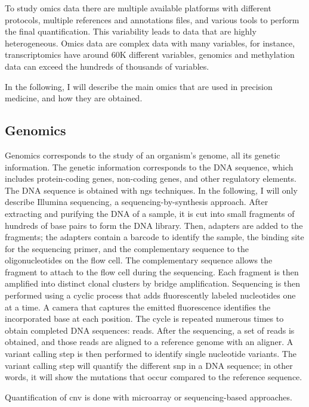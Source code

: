 \documentclass[../main.tex]{subfiles}
\begin{document}
 To study omics data there are multiple available platforms with different protocols, multiple references and annotations files, and various tools to perform the final quantification.
 This variability leads to data that are highly heterogeneous.
 Omics data are complex data with many variables, for instance, transcriptomics have around 60K different variables, genomics and methylation data can exceed the hundreds of thousands of variables.

 In the following, I will describe the main omics that are used in precision medicine, and how they are obtained.

 \subsection{Genomics}\label{subsec:genomics}
	 Genomics corresponds to the study of an organism's genome, \ie{}all its genetic information.
	 The genetic information corresponds to the DNA sequence, which includes protein-coding genes, non-coding genes, and other regulatory elements.
	 The DNA sequence is obtained with \gls{ngs} techniques.
	 In the following, I will only describe Illumina sequencing, a sequencing-by-synthesis approach.
	 After extracting and purifying the DNA of a sample, it is cut into small fragments of hundreds of base pairs to form the DNA library.
	 Then, adapters are added to the fragments; the adapters contain a barcode to identify the sample, the binding site for the sequencing primer, and the complementary sequence to the oligonucleotides on the flow cell.
	 The complementary sequence allows the fragment to attach to the flow cell during the sequencing.
	 Each fragment is then amplified into distinct clonal clusters by bridge amplification.
	 Sequencing is then performed using a cyclic process that adds fluorescently labeled nucleotides one at a time.
	 A camera that captures the emitted fluorescence identifies the incorporated base at each position.
	 The cycle is repeated numerous times to obtain completed DNA sequences: reads.
	 After the sequencing, a set of reads is obtained, and those reads are aligned to a reference genome with an aligner.
	 A variant calling step is then performed to identify single nucleotide variants.
	 The variant calling step will quantify the different \gls{snp} in a DNA sequence; in other words, it will show the mutations that occur compared to the reference sequence.

	 Quantification of \gls{cnv} is done with microarray or sequencing-based approaches.
\end{document}
